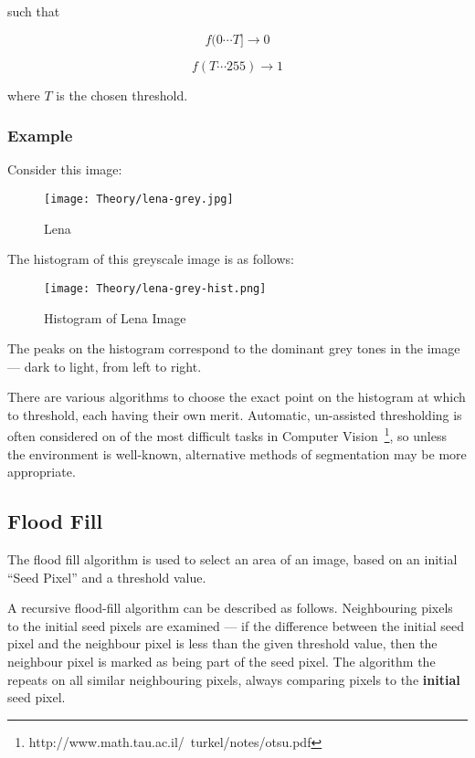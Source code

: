 such that

\begin{equation}
f(0\cdots T] \rightarrow 0
\end{equation}

\begin{equation}
f(T\cdots 255) \rightarrow 1
\end{equation}

where $T$ is the chosen threshold.
\subsubsection{Example}
Consider this image:

\begin{figure}
    \centering
    \texttt{[image: Theory/lena-grey.jpg]}
    \caption{Lena}
\end{figure}

The histogram of this greyscale image is as follows:

\begin{figure}[H]
    \centering
    \texttt{[image: Theory/lena-grey-hist.png]}
    \caption{Histogram of Lena Image}
\end{figure}

The peaks on the histogram correspond to the dominant grey tones in the image --- dark to light, from left to right.

There are various algorithms to choose the exact point on the histogram at which to threshold, each having their own merit. Automatic, un-assisted thresholding is often considered on of the most difficult tasks in Computer Vision~\footnote{http://www.math.tau.ac.il/~turkel/notes/otsu.pdf}, so unless the environment is well-known, alternative methods of segmentation may be more appropriate.

\subsection{Flood Fill}
\label{sec:floodfill}
The flood fill algorithm is used to select an area of an image, based on an initial ``Seed Pixel'' and a threshold value.

A recursive flood-fill algorithm can be described as follows. Neighbouring pixels to the initial seed pixels are examined --- if the difference between the initial seed pixel and the neighbour pixel is less than the given threshold value, then the neighbour pixel is marked as being part of the seed pixel. The algorithm the repeats on all similar neighbouring pixels, always comparing pixels to the \textbf{initial} seed pixel.

